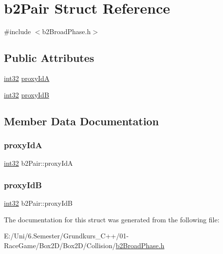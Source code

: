 \hypertarget{structb2_pair}{}\section{b2\+Pair Struct Reference}
\label{structb2_pair}


{\ttfamily \#include $<$b2\+Broad\+Phase.\+h$>$}

\subsection*{Public Attributes}
\begin{DoxyCompactItemize}
\item 
\mbox{\hyperlink{b2_settings_8h_a43d43196463bde49cb067f5c20ab8481}{int32}} \mbox{\hyperlink{structb2_pair_abae3df5e877cf0c4611334e3eec4b84c}{proxy\+IdA}}
\item 
\mbox{\hyperlink{b2_settings_8h_a43d43196463bde49cb067f5c20ab8481}{int32}} \mbox{\hyperlink{structb2_pair_af2bd888ccb34535ab9126497349da749}{proxy\+IdB}}
\end{DoxyCompactItemize}


\subsection{Member Data Documentation}
\mbox{\label{structb2_pair_abae3df5e877cf0c4611334e3eec4b84c}} 
\subsubsection{\texorpdfstring{proxyIdA}{proxyIdA}}
{\footnotesize\ttfamily \mbox{\hyperlink{b2_settings_8h_a43d43196463bde49cb067f5c20ab8481}{int32}} b2\+Pair\+::proxy\+IdA}

\mbox{\label{structb2_pair_af2bd888ccb34535ab9126497349da749}} 
\subsubsection{\texorpdfstring{proxyIdB}{proxyIdB}}
{\footnotesize\ttfamily \mbox{\hyperlink{b2_settings_8h_a43d43196463bde49cb067f5c20ab8481}{int32}} b2\+Pair\+::proxy\+IdB}



The documentation for this struct was generated from the following file\+:\begin{DoxyCompactItemize}
\item 
E\+:/\+Uni/6.\+Semester/\+Grundkurs\+\_\+\+C++/01-\/\+Race\+Game/\+Box2\+D/\+Box2\+D/\+Collision/\mbox{\hyperlink{b2_broad_phase_8h}{b2\+Broad\+Phase.\+h}}\end{DoxyCompactItemize}
